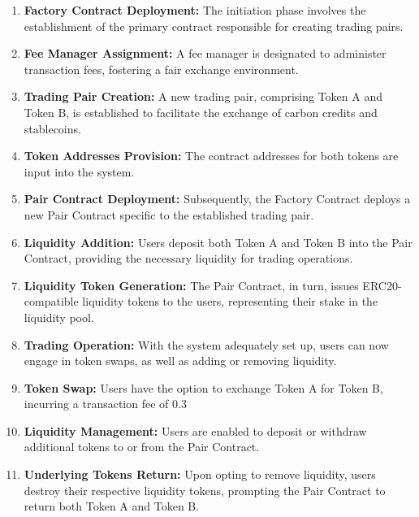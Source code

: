 \documentclass[sigconf, authordraft]{acmart}
\begin{document}
	\begin{enumerate}
		\item \textbf{Factory Contract Deployment:} The initiation phase involves the
			establishment of the primary contract responsible for creating trading pairs.

		\item \textbf{Fee Manager Assignment:} A fee manager is designated to administer
			transaction fees, fostering a fair exchange environment.

		\item \textbf{Trading Pair Creation:} A new trading pair, comprising Token A
			and Token B, is established to facilitate the exchange of carbon credits and
			stablecoins.

		\item \textbf{Token Addresses Provision:} The contract addresses for both tokens
			are input into the system.

		\item \textbf{Pair Contract Deployment:} Subsequently, the Factory Contract
			deploys a new Pair Contract specific to the established trading pair.

		\item \textbf{Liquidity Addition:} Users deposit both Token A and Token B into
			the Pair Contract, providing the necessary liquidity for trading
			operations.

		\item \textbf{Liquidity Token Generation:} The Pair Contract, in turn, issues
			ERC20-compatible liquidity tokens to the users, representing their stake
			in the liquidity pool.

		\item \textbf{Trading Operation:} With the system adequately set up, users
			can now engage in token swaps, as well as adding or removing liquidity.

		\item \textbf{Token Swap:} Users have the option to exchange Token A for Token
			B, incurring a transaction fee of 0.3%


		\item \textbf{Liquidity Management:} Users are enabled to deposit or withdraw
			additional tokens to or from the Pair Contract.

		\item \textbf{Underlying Tokens Return:} Upon opting to remove liquidity,
			users destroy their respective liquidity tokens, prompting the Pair Contract
			to return both Token A and Token B.
	\end{enumerate}
\end{document}
